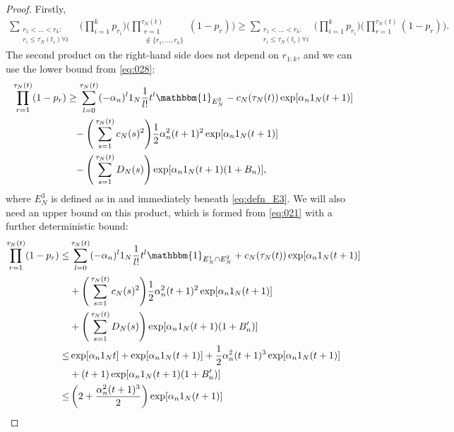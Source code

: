 \documentclass[12pt,authoryear]{article}
\theoremstyle{definition}
\newcommand{\1}[1]{\mathbbm{1}_{#1}}
\newcommand{\ON}{1_N}
\begin{document}
\begin{proof}
Firstly,
\begin{align}
\sum_{\substack{r_1 <\dots< r_k :\\ r_i \leq \tau_N(t_i) \forall i}}
        &\Bigg( \prod_{i=1}^k p_{r_i} \Bigg)
        \Bigg( \prod_{\substack{r=1 \\ \notin \{r_1,\dots,r_k\} }}^{\tau_N(t)} 
        (1-p_r) \Bigg) \geq \sum_{\substack{r_1 <\dots< r_k :\\ r_i \leq \tau_N(t_i) \forall i}}
        \Bigg( \prod_{i=1}^k p_{r_i} \Bigg)
        \Bigg( \prod_{r=1}^{\tau_N(t)} 
        (1-p_r) \Bigg). \label{eq:032a}
\end{align}
The second product on the right-hand side does not depend on $r_{ 1 : k }$, and we can use the lower bound from \eqref{eq:028}:
\begin{align}
\prod_{r=1}^{\tau_N(t)} (1-p_r)
&\geq \sum_{l=0}^{\tau_N(t)} (-\alpha_n)^l \ON 
        \frac{1}{l!} t^l \1{E_N^3} - c_N(\tau_N(t)) \exp[ \alpha_n \ON (t+1) ] \notag \\
    &\phantom{\geq} - \Bigg( \sum_{s=1}^{\tau_N(t)} c_N(s)^2 \Bigg)
        \frac{1}{2} \alpha_n^2 (t+1)^2 \exp[ \alpha_n \ON (t+1) ]\notag\\
    &\phantom{\geq} - \Bigg( \sum_{s=1}^{\tau_N(t)} D_N(s) \Bigg)
        \exp[ \alpha_n \ON (t+1) (1+B_n) ], \label{eq:033a}
\end{align}
where $E_N^3$ is defined as in and immediately beneath \eqref{eq:defn_E3}.
We will also need an upper bound on this product, which is formed from \eqref{eq:021} with a further deterministic bound:
\begin{align}
\prod_{r=1}^{\tau_N(t)}  (1-p_r)
\leq & \sum_{l=0}^{\tau_N(t)} (-\alpha_n)^l \ON \frac{1}{l!} t^l \1{E_N^1 \cap E_N^2}
        + c_N(\tau_N(t)) \exp[ \alpha_n \ON (t+1) ] \notag\\
    & + \Bigg( \sum_{s=1}^{\tau_N(t)} c_N(s)^2 \Bigg)
        \frac{1}{2} \alpha_n^2 (t+1)^2 \exp[ \alpha_n \ON (t+1) ] \notag\\
    & + \Bigg( \sum_{s=1}^{\tau_N(t)} D_N(s) \Bigg)
        \exp[ \alpha_n \ON (t+1) (1+B_n^\prime) ] \notag\\
\leq& \exp[ \alpha_n \ON t ]
        + \exp[ \alpha_n \ON (t+1) ]  + \frac{1}{2} \alpha_n^2 (t+1)^3
        \exp[ \alpha_n \ON (t+1) ] \notag\\
        &+ (t+1) \exp[ \alpha_n \ON (t+1) (1+B_n^\prime) ] \notag\\
\leq& \left( 2 + \frac{\alpha_n^2 (t+1)^3}{2} \right) 
        \exp[ \alpha_n \ON (t+1) ] \notag \\

\end{align}
\end{proof}
\end{document}
